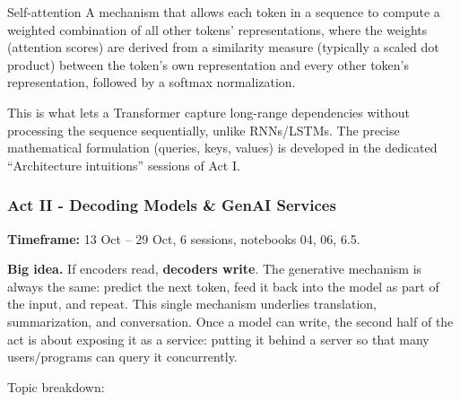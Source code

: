 \begin{defbox}{Self-attention}
A mechanism that allows each token in a sequence to compute a weighted combination of all other tokens' representations, where the weights (attention scores) are derived from a similarity measure (typically a scaled dot product) between the token's own representation and every other token's representation, followed by a softmax normalization. 
\end{defbox}

This is what lets a Transformer capture long-range dependencies without processing the sequence sequentially, unlike RNNs/LSTMs. The precise mathematical formulation (queries, keys, values) is developed in the dedicated ``Architecture intuitions'' sessions of Act I.

\subsubsection{Act II - Decoding Models \& GenAI Services}

\textbf{Timeframe:} 13 Oct -- 29 Oct, 6 sessions, notebooks 04, 06, 6.5.

\textbf{Big idea.} If encoders read, \textbf{decoders write}. The generative mechanism is always the same: predict the next token, feed it back into the model as part of the input, and repeat. This single mechanism underlies translation, summarization, and conversation. Once a model can write, the second half of the act is about exposing it as a service: putting it behind a server so that many users/programs can query it concurrently.

Topic breakdown:

